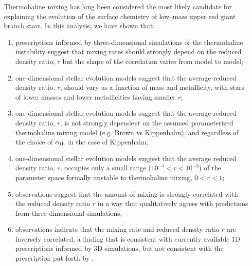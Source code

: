 %
%
%
Thermohaline mixing has long been considered the most likely candidate for explaining the evolution of the surface chemistry of low--mass upper red giant branch stars. In this analysis, we have shown that:
%
% 
\begin{enumerate}
    \item prescriptions informed by three-dimensional simulations of the thermohaline instability suggest that mixing rates should strongly depend on the reduced density ratio, $r$ but the shape of the correlation varies from model to model; 
    
    \item one-dimensional stellar evolution models suggest that the average reduced density ratio, $r$, should vary as a function of mass and metallicity, with stars of lower masses and lower metallicities having smaller $r$;
    
    \item one-dimensional stellar evolution models suggest that the average reduced density ratio, $r$, is not strongly dependent on the assumed parameterized thermohaline mixing model (e.g. Brown vs Kippenhahn), and regardless of the choice of $\alpha_{\rm th}$ in the case of Kippenhahn; 
    
    \item one-dimensional stellar evolution models suggest that the average reduced density ratio, $r$, occupies only a small range ($10^{-4}<r<10^{-3}$) of the parameter space formally unstable to thermohaline mixing, $0<r<1$;
    
    \item observations suggest that the amount of mixing is strongly correlated with the reduced density ratio $r$ in a way that qualitatively agrees with predictions from three dimensional simulations;
    
    \item observations indicate that the mixing rate and reduced density ratio $r$ are inversely correlated, a finding that is consistent with 
    currently available 1D prescriptions informed by 3D simulations, but not consistent with the prescription put forth by \citet{harrington}.
    
    \end{enumerate}

